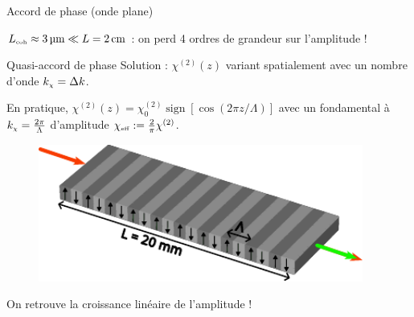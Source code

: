 \documentclass{beamer}
\newcommand{\chie}{\chi_\mathsc{eff}}
\newcommand{\dke}{\Delta k_\mathsc{eff}}
\begin{document}
\begin{frame}{Accord de phase (onde plane)}
\centering

\begin{beamerboxesrounded}[width=0.8\textwidth]{}
$L_{\mathrm{\scriptscriptstyle {coh}}} \approx \SI{3}{\micro\meter} \ll L = \SI{2}{cm}$ : on perd 4 ordres de grandeur sur l'amplitude !
\end{beamerboxesrounded}
\end{frame}

\begin{frame}{Quasi-accord de phase}
Solution : $\chi^{(2)}(z)$ variant spatialement avec un nombre d'onde $k_{\mathrm{\scriptscriptstyle {\chi}}} = \Delta k$.
\pause

En pratique, $\chi^{(2)}(z) = \chi^{(2)}_0 \operatorname{sign}[\cos(2\pi z/ \Lambda)]$ avec un fondamental à $k_{\mathrm{\scriptscriptstyle {\chi}}} = \frac{2\pi}{\Lambda}$ d'amplitude $\chie := \frac2\pi \chi^{(2)}$.

\begin{figure}
\centering
\includegraphics[height=4.5cm]{./img/PP.pdf}
\end{figure}




\end{frame}

\begin{frame}
\centering

\begin{beamerboxesrounded}[width=0.8\textwidth]{}
On retrouve la croissance linéaire de l'amplitude !
\end{beamerboxesrounded}
\end{frame}

\end{document}
